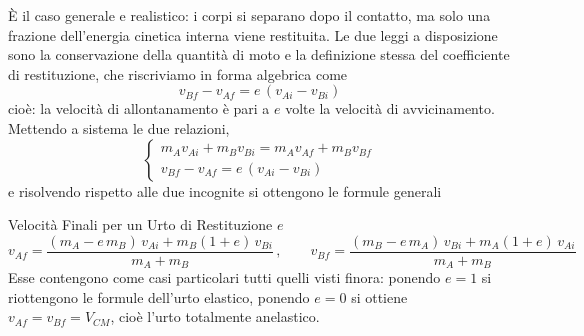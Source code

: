 È il caso generale e realistico: i corpi si separano dopo il contatto, ma solo una frazione dell'energia cinetica interna viene restituita. Le due leggi a disposizione sono la conservazione della quantità di moto e la definizione stessa del coefficiente di restituzione, che riscriviamo in forma algebrica come
\begin{equation}
    v_{Bf} - v_{Af} = e\,(v_{Ai} - v_{Bi})
\end{equation}
cioè: la velocità di allontanamento è pari a $e$ volte la velocità di avvicinamento. Mettendo a sistema le due relazioni,
\begin{equation}
\begin{cases}
    m_A v_{Ai} + m_B v_{Bi} = m_A v_{Af} + m_B v_{Bf} \\[3pt]
    v_{Bf} - v_{Af} = e\,(v_{Ai} - v_{Bi})
\end{cases}
\end{equation}
e risolvendo rispetto alle due incognite si ottengono le formule generali

\begin{formulario}{Velocità Finali per un Urto di Restituzione $e$}
\begin{equation}
    v_{Af} = \frac{(m_A - e\,m_B)\,v_{Ai} + m_B(1+e)\,v_{Bi}}{m_A + m_B}
    \, , \qquad
    v_{Bf} = \frac{(m_B - e\,m_A)\,v_{Bi} + m_A(1+e)\,v_{Ai}}{m_A + m_B}
\end{equation}
Esse contengono come casi particolari tutti quelli visti finora: ponendo $e = 1$ si riottengono le formule dell'urto elastico, ponendo $e = 0$ si ottiene $v_{Af} = v_{Bf} = V_{CM}$, cioè l'urto totalmente anelastico.
\end{formulario}

